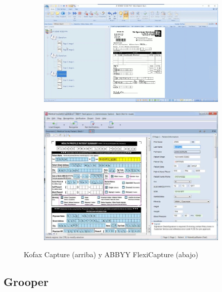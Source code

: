 \begin{figure}
    \centering
    \begin{subfigure}[b]{0.9\textwidth}
        \centering
        \includegraphics[width=\textwidth]{imaxes/b-estado-arte/kofax-capture}
        \label{fig:hough-punto-imagen}
    \end{subfigure}
    \begin{subfigure}[b]{0.9\textwidth}
        \centering
        \includegraphics[width=\textwidth]{imaxes/b-estado-arte/abbyy-flexicapture}
        \label{fig:hough-intersection}
    \end{subfigure}
    \caption{Kofax Capture (arriba) y ABBYY FlexiCapture (abajo)}
    \label{fig:kofax-capture-y-abbyy-flexicapture}
\end{figure}

\subsection{Grooper}

